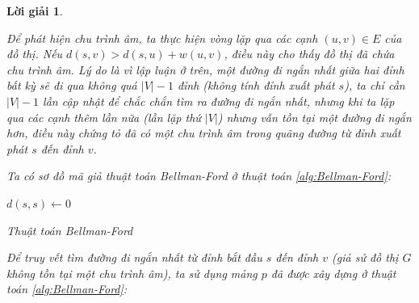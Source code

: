 \documentclass[14pt, a4paper]{article}
\theoremstyle{sltheorem}
\theoremstyle{soltheorem}
\newtheorem*{loigiai}{Lời giải}
\begin{document}
\begin{loigiai}
\begin{itemize}
\begin{itemize}
                Để phát hiện chu trình âm, ta thực hiện vòng lặp qua các cạnh $(u, v) \in E$ của đồ thị.
                Nếu $d(s, v) > d(s, u) + w(u, v)$, điều này cho thấy đồ thị đã chứa chu trình âm.
                Lý do là vì lập luận ở trên, một đường đi ngắn nhất giữa hai đỉnh bất kỳ sẽ đi qua không quá $\lvert V \rvert - 1$ đỉnh (không tính đỉnh xuất phát $s$),
                ta chỉ cần $\lvert V \rvert - 1$ lần cập nhật để chắc chắn tìm ra đường đi ngắn nhất, nhưng khi ta lặp qua các cạnh thêm lần nữa (lần lặp thứ $\lvert V \rvert$)
                nhưng vẫn tồn tại một đường đi ngắn hơn, điều này chứng tỏ đã có một chu trình âm trong quãng đường từ đỉnh xuất phát $s$ đến đỉnh $v$.

                Ta có sơ đồ mã giả thuật toán Bellman-Ford ở thuật toán \ref{alg:Bellman-Ford}: 

                \begin{algorithm}[h!]
                    \DontPrintSemicolon
                    $d(s, s) \gets 0$\;


                    \caption{Thuật toán Bellman-Ford}
                    \label{alg:Bellman-Ford}
                \end{algorithm}

                Để truy vết tìm đường đi ngắn nhất từ đỉnh bắt đầu $s$ đến đỉnh $v$ (giả sử đồ thị $G$ không tồn tại một chu trình âm),
                ta sử dụng mảng $p$ đã được xây dựng ở thuật toán \ref{alg:Bellman-Ford}:


\end{itemize}
\end{itemize}
\end{loigiai}
\end{document}
